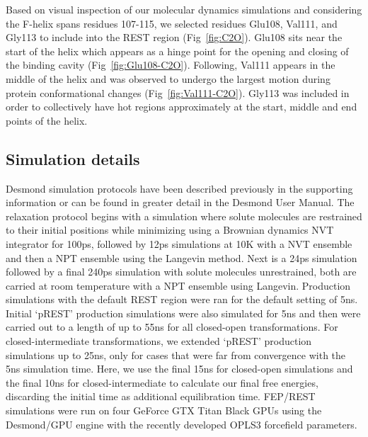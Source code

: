 \documentclass[journal=jctcce,manuscript=article]{achemso}
\begin{document}
Based on visual inspection of our molecular dynamics simulations and considering the F-helix spans residues 107-115, we selected residues Glu108, Val111, and Gly113 to include into the REST region (Fig~\ref{fig:C2O}).
Glu108 sits near the start of the helix which appears as a hinge point for the opening and closing of the binding cavity (Fig~\ref{fig:Glu108-C2O}).
Following, Val111 appears in the middle of the helix and was observed to undergo the largest motion during protein conformational changes (Fig~\ref{fig:Val111-C2O}).
Gly113 was included in order to collectively have hot regions approximately at the start, middle and end points of the helix.

\subsection*{Simulation details}
Desmond\cite{DESMONDSoftware,DESMONDarticle,DESMONDPaper1,DESMONDPaper2} simulation protocols have been described previously in the supporting information\cite{FEPplus} or can be found in greater detail in the Desmond User Manual\cite{DESMONDManual}.
The relaxation protocol begins with a simulation where solute molecules are restrained to their initial positions while minimizing using a Brownian dynamics NVT integrator for 100ps, followed by 12ps simulations at 10K with a NVT ensemble and then a NPT ensemble using the Langevin method\cite{Langevin}.
Next is a 24ps simulation followed by a final 240ps simulation with solute molecules unrestrained, both are carried at room temperature with a NPT ensemble using Langevin.
Production simulations with the default REST region were ran for the default setting of 5ns. 
Initial `pREST' production simulations were also simulated for 5ns and then were carried out to a length of up to 55ns for all closed-open transformations. 
For closed-intermediate transformations, we extended `pREST' production simulations up to 25ns, only for cases that were far from convergence with the 5ns simulation time.
Here, we use the final 15ns for closed-open simulations and the final 10ns for closed-intermediate to calculate our final free energies, discarding the initial time as additional equilibration time.
FEP/REST simulations were run on four GeForce GTX Titan Black GPUs using the Desmond/GPU engine with the recently developed OPLS3\cite{OPLS3} forcefield parameters.
\end{document}
